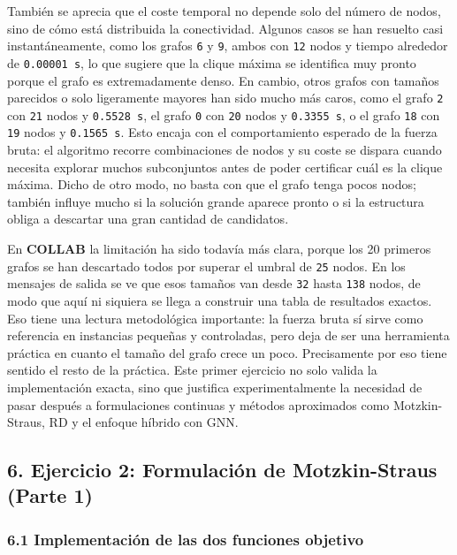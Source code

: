 \documentclass[11pt]{article}
\begin{document}
También se aprecia que el coste temporal no depende solo del número de
nodos, sino de cómo está distribuida la conectividad. Algunos casos se
han resuelto casi instantáneamente, como los grafos \texttt{6} y
\texttt{9}, ambos con \texttt{12} nodos y tiempo alrededor de
\texttt{0.00001\ s}, lo que sugiere que la clique máxima se identifica
muy pronto porque el grafo es extremadamente denso. En cambio, otros
grafos con tamaños parecidos o solo ligeramente mayores han sido mucho
más caros, como el grafo \texttt{2} con \texttt{21} nodos y
\texttt{0.5528\ s}, el grafo \texttt{0} con \texttt{20} nodos y
\texttt{0.3355\ s}, o el grafo \texttt{18} con \texttt{19} nodos y
\texttt{0.1565\ s}. Esto encaja con el comportamiento esperado de la
fuerza bruta: el algoritmo recorre combinaciones de nodos y su coste se
dispara cuando necesita explorar muchos subconjuntos antes de poder
certificar cuál es la clique máxima. Dicho de otro modo, no basta con
que el grafo tenga pocos nodos; también influye mucho si la solución
grande aparece pronto o si la estructura obliga a descartar una gran
cantidad de candidatos.

En \textbf{COLLAB} la limitación ha sido todavía más clara, porque los
20 primeros grafos se han descartado todos por superar el umbral de
\texttt{25} nodos. En los mensajes de salida se ve que esos tamaños van
desde \texttt{32} hasta \texttt{138} nodos, de modo que aquí ni siquiera
se llega a construir una tabla de resultados exactos. Eso tiene una
lectura metodológica importante: la fuerza bruta sí sirve como
referencia en instancias pequeñas y controladas, pero deja de ser una
herramienta práctica en cuanto el tamaño del grafo crece un poco.
Precisamente por eso tiene sentido el resto de la práctica. Este primer
ejercicio no solo valida la implementación exacta, sino que justifica
experimentalmente la necesidad de pasar después a formulaciones
continuas y métodos aproximados como Motzkin-Straus, RD y el enfoque
híbrido con GNN.

    \subsection{6. Ejercicio 2: Formulación de Motzkin-Straus (Parte
1)}\label{ejercicio-2-formulaciuxf3n-de-motzkin-straus-parte-1}

    \subsubsection{6.1 Implementación de las dos funciones
objetivo}\label{implementaciuxf3n-de-las-dos-funciones-objetivo}
\end{document}
